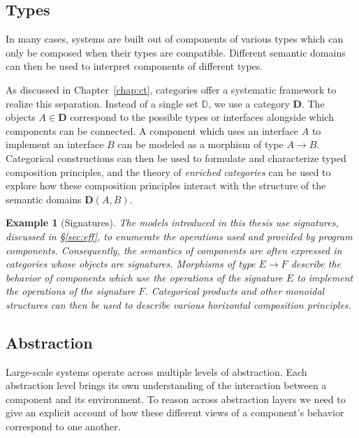 \documentclass[11pt,oneside]{book}
\newtheorem{example}[theorem]{Example}
\theoremstyle{definition}
\begin{document}

\subsection{Types} %

In many cases,
systems are built out of components of various types
which can only be composed when their types are compatible.
Different semantic domains can then be used
to interpret components of different types.

As discussed in Chapter~\ref{chap:ct},
categories offer a systematic framework
to realize this separation.
Instead of a single set $\mathbb{D}$,
we use a category $\mathbf{D}$.
The objects $A \in \mathbf{D}$ correspond to
the possible types or interfaces alongside which
components can be connected.
A component which
uses an interface $A$ to
implement an interface $B$
can be modeled as a morphism
of type $A \rightarrow B$.
Categorical constructions can then be used
to formulate and characterize typed composition principles,
and the theory of \emph{enriched categories}
can be used to explore how these composition principles
interact with the structure of the semantic domains
$\mathbf{D}(A, B)$.

\begin{example}[Signatures] %
The models introduced in this thesis use \emph{signatures},
discussed in \S\ref{sec:eff},
to enumerate the operations used and provided by program components.
Consequently,
the semantics of components are often expressed in categories
whose objects are signatures.
Morphisms of type $E \rightarrow F$
describe the behavior of components
which use the operations of the signature $E$
to implement the operations of the signature $F$.
Categorical products and other monoidal structures
can then be used to describe various
horizontal composition principles.
\end{example}


\subsection{Abstraction} %

Large-scale systems operate across multiple levels of abstraction.
Each abstraction level brings its own understanding of the interaction
between a component and its environment.
To reason across abstraction layers we need to give
an explicit account of how these different views
of a component's behavior
correspond to one another.
\end{document}
